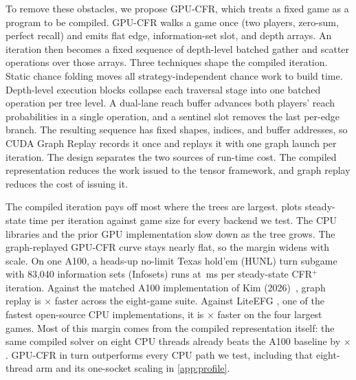 To remove these obstacles, we propose GPU-CFR, which treats a fixed game as a program
to be compiled. GPU-CFR walks a game once (two
players, zero-sum, perfect recall) and emits flat edge,
information-set slot, and depth arrays. An iteration then becomes a fixed sequence of
depth-level batched gather and scatter operations over those arrays. Three techniques
shape the compiled iteration. Static chance folding moves all strategy-independent
chance work to build time. Depth-level execution blocks collapse each traversal stage
into one batched operation per tree level. A dual-lane reach buffer advances both
players' reach probabilities in a single operation, and a sentinel slot removes the
last per-edge branch. The resulting sequence has fixed shapes, indices, and buffer
addresses, so CUDA Graph Replay \cite{guide2020cuda} records it once and replays it
with one graph launch per iteration. The design separates the two sources of run-time
cost. The compiled representation reduces the work issued to the tensor framework, and
graph replay reduces the cost of issuing it.

The compiled iteration pays off most where the trees are largest.  plots
steady-state time per iteration against game size for every backend we test. The CPU
libraries and the prior GPU implementation slow down as the tree grows. The
graph-replayed GPU-CFR curve stays nearly flat, so the margin widens with scale. On
one A100, a heads-up no-limit Texas hold'em (HUNL) turn subgame with 83{,}040
information sets (Infosets) runs at \turnSteadyMs\,ms per
steady-state CFR$^{+}$ iteration. Against the matched A100 implementation of
Kim (2026)~\cite{kim2026parallelizing}, graph replay is \kimGraphRange$\times$ faster
across the eight-game suite. Against LiteEFG \cite{liu2024liteefg}, one of the
fastest open-source CPU implementations, it is
\liteGraphLargestRange$\times$ faster on the four largest games. Most of this margin
comes from the compiled representation itself: the same compiled solver on eight CPU
threads already beats the A100 baseline by \kimCpuRange$\times$. GPU-CFR in turn
outperforms every CPU path we test, including that eight-thread arm and its one-socket
scaling in \cref{app:profile}.

